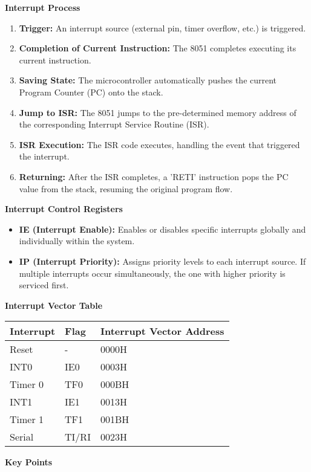 \documentclass[
]{article}
\begin{document}
\textbf{Interrupt Process}

\begin{enumerate}
\def\labelenumi{\arabic{enumi}.}
\item
  \textbf{Trigger:} An interrupt source (external pin, timer overflow,
  etc.) is triggered.
\item
  \textbf{Completion of Current Instruction:} The 8051 completes
  executing its current instruction.
\item
  \textbf{Saving State:} The microcontroller automatically pushes the
  current Program Counter (PC) onto the stack.
\item
  \textbf{Jump to ISR:} The 8051 jumps to the pre-determined memory
  address of the corresponding Interrupt Service Routine (ISR).
\item
  \textbf{ISR Execution:} The ISR code executes, handling the event that
  triggered the interrupt.
\item
  \textbf{Returning:} After the ISR completes, a 'RETI' instruction pops
  the PC value from the stack, resuming the original program flow.
\end{enumerate}

\textbf{Interrupt Control Registers}

\begin{itemize}
\item
  \textbf{IE (Interrupt Enable):} Enables or disables specific
  interrupts globally and individually within the system.
\item
  \textbf{IP (Interrupt Priority):} Assigns priority levels to each
  interrupt source. If multiple interrupts occur simultaneously, the one
  with higher priority is serviced first.
\end{itemize}

\textbf{Interrupt Vector Table}

\begin{longtable}[]{@{}lll@{}}
\toprule
Interrupt & Flag & Interrupt Vector Address \\
\midrule
\endhead
Reset & - & 0000H \\
INT0 & IE0 & 0003H \\
Timer 0 & TF0 & 000BH \\
INT1 & IE1 & 0013H \\
Timer 1 & TF1 & 001BH \\
Serial & TI/RI & 0023H \\
\bottomrule
\end{longtable}

\textbf{Key Points}
\end{document}
